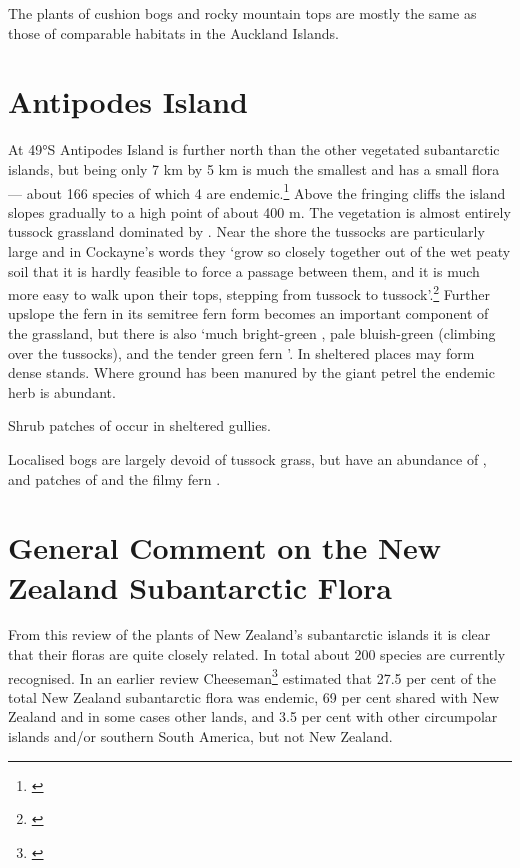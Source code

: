 The plants of cushion bogs and rocky mountain tops are mostly the same as those of comparable habitats in the Auckland Islands.

\section{Antipodes Island}

At 49°S Antipodes Island is further north than the other vegetated subantarctic islands, but being only 7 km by 5 km is much the smallest and has a small flora --- about 166 species of which 4 are endemic.\footnote{\cite{williams1982species}}
Above the fringing cliffs the island slopes gradually to a high point of about 400 m.
The vegetation is almost entirely tussock grassland dominated by .
Near the shore the tussocks are particularly large and in Cockayne's words they `grow so closely together out of the wet peaty soil that it is hardly feasible to force a passage between them, and it is much more easy to walk upon their tops, stepping from tussock to tussock'.\footnote{\cite{cockayne1909ecological}}
Further upslope the fern  in its semitree fern form becomes an important component of the grassland, but there is also `much bright-green , pale bluish-green  (climbing over the tussocks), and the tender green fern '.
In sheltered places  may form dense stands.
Where ground has been manured by the giant petrel the endemic herb  is abundant.

Shrub patches of  occur in sheltered gullies.

Localised bogs are largely devoid of tussock grass, but have an abundance of ,  and patches of  and the filmy fern .

\section{General Comment on the New Zealand Subantarctic Flora}

From this review of the plants of New Zealand's subantarctic islands it is clear that their floras are quite closely related.
In total about 200 species are currently recognised.
In an earlier review Cheeseman\footnote{\cite{cheeseman1909systematic}} estimated that 27.5 per cent of the total New Zealand subantarctic flora was endemic, 69 per cent shared with New Zealand and in some cases other lands, and 3.5 per cent with other circumpolar islands and/or southern South America, but not New Zealand.

